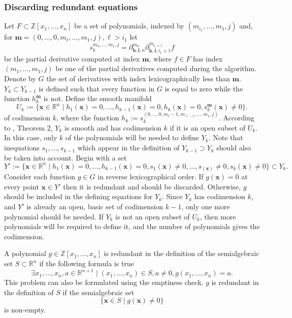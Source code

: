 \documentclass[
]{book}
\theoremstyle{definition}
\theoremstyle{definition}
\theoremstyle{definition}
\theoremstyle{definition}
\theoremstyle{remark}
\begin{document}
\hypertarget{discarding-redundant-equations}{%
\subsubsection{Discarding redundant equations}\label{discarding-redundant-equations}}

Let \(F \subset \mathbb{Z}[x_1,\ldots,x_n]\) be a set of polynomials, indexed by \((m_{i_1},\ldots,m_1,j)\) and, for \(\mathbf{m} = (0,\ldots,0,m_\ell,\ldots,m_1,j),\ell > i_1\) let
\[
s^{m_n,\ldots,m_1,j}_k = \partial_{\mathbf{h}, \mathbf{i}, n}^{m_n} \partial_{\mathbf{h}, \mathbf{i}, i_1 + 1}^{m_{i_1 + 1}} f
\]
be the partial derivative computed at index \(\mathbf{m}\), where \(f \in F\) has index \((m_1,\ldots,m_1,j)\) be one of the partial derivatives computed during the algorithm.
Denote by \(G\) the set of derivatives with index lexicographically less than \(\mathbf{m}\). \(Y_k \subset Y_{k-1}\) is defined such that every function in \(G\) is equal to zero while the function \(h^{\mathbf{m}}_k\) is not.
Define the smooth manifold
\[
U_k := \{ \mathbf{x} \in \mathbb{R}^n \mid h_1(\mathbf{x}) = 0, \ldots, h_{k-1}(\mathbf{x}) = 0, h_k(\mathbf{x}) = 0, s^{\mathbf{m}}_k(\mathbf{x}) \ne 0 \}.
\]
of codimension \(k\), where the function \(h_k := s^{(0,\ldots,0,m_\ell - 1,m_{\ell - 1},\ldots,m_1,j)}_k\). According to \citet{gv1995}, Theorem 2, \(Y_k\) is smooth and has codimension \(k\) if it is an open subset of \(U_k\). In this case, only \(k\) of the polynomials will be needed to define \(Y_k\). Note that inequations \(s_1,\ldots,s_{k-1}\) which appear in the definition of \(Y_{k-1} \supset Y_k\) should also be taken into account.
Begin with a set
\[
Y' := \{ \mathbf{x} \in \mathbb{R}^n \mid h_1(\mathbf{x}) = 0, \ldots, h_{k-1}(\mathbf{x}) = 0, s_1(\mathbf{x}) \ne 0, \ldots, s_(\mathbf{x}) \ne 0, s_k(\mathbf{x}) \ne 0 \} \subset Y_k.
\]
Consider each function \(g \in G\) in reverse lexicographical order. If \(g(\mathbf{x}) = 0\) at every point \(\mathbf{x} \in Y'\) then it is redundant and should be discarded. Otherwise, \(g\) should be included in the defining equations for \(Y_k\). Since \(Y_k\) has codimension \(k\), and \(Y'\) is already an open, basic set of codimension \(k-1\), only one more polynomial should be needed.
If \(Y_k\) is not an open subset of \(U_k\), then more polynomials will be required to define it, and the number of polynomials gives the codimension.

A polynomial \(g \in \mathbb{Z}[x_1,\ldots,x_n]\) is redundant in the definition of the semialgebraic set \(S \subset \mathbb{R}^n\) if the following formula is true
\[
\exists x_1,\ldots,x_n,a \in \mathbb{R}^{n+1} \mid (x_1,\ldots,x_n) \in S, a \ne 0, g(x_1,\ldots,x_n) = a.
\]
This problem can also be formulated using the emptiness check. \(g\) is redundant in the definition of \(S\) if the semialgebraic set
\[
\{ \mathbf{x} \in S \mid g(\mathbf{x}) \ne 0 \}
\]
is non-empty.
\end{document}
